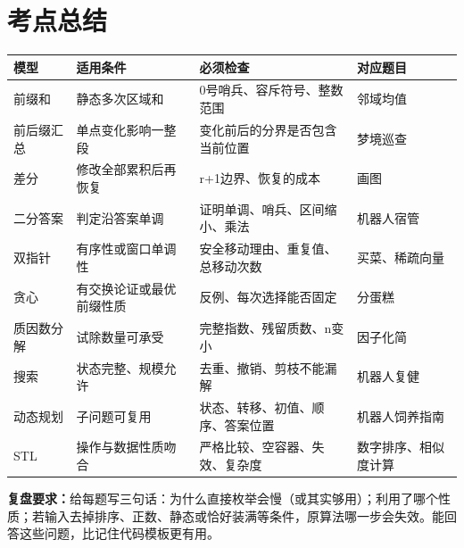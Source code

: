 \section{考点总结}
\begin{longtable}{P{2.6cm}P{4.3cm}P{4.1cm}P{3cm}}
\toprule 模型 & 适用条件 & 必须检查 & 对应题目\\\midrule\endhead
前缀和 & 静态多次区域和 & 0号哨兵、容斥符号、整数范围 & 邻域均值\\
前后缀汇总 & 单点变化影响一整段 & 变化前后的分界是否包含当前位置 & 梦境巡查\\
差分 & 修改全部累积后再恢复 & r+1边界、恢复的成本 & 画图\\
二分答案 & 判定沿答案单调 & 证明单调、哨兵、区间缩小、乘法 & 机器人宿管\\
双指针 & 有序性或窗口单调性 & 安全移动理由、重复值、总移动次数 & 买菜、稀疏向量\\
贪心 & 有交换论证或最优前缀性质 & 反例、每次选择能否固定 & 分蛋糕\\
质因数分解 & 试除数量可承受 & 完整指数、残留质数、n变小 & 因子化简\\
搜索 & 状态完整、规模允许 & 去重、撤销、剪枝不能漏解 & 机器人复健\\
动态规划 & 子问题可复用 & 状态、转移、初值、顺序、答案位置 & 机器人饲养指南\\
STL & 操作与数据性质吻合 & 严格比较、空容器、失效、复杂度 & 数字排序、相似度计算\\
\bottomrule\end{longtable}
\textbf{复盘要求：}给每题写三句话：为什么直接枚举会慢（或其实够用）；利用了哪个性质；若输入去掉排序、正数、静态或恰好装满等条件，原算法哪一步会失效。能回答这些问题，比记住代码模板更有用。
